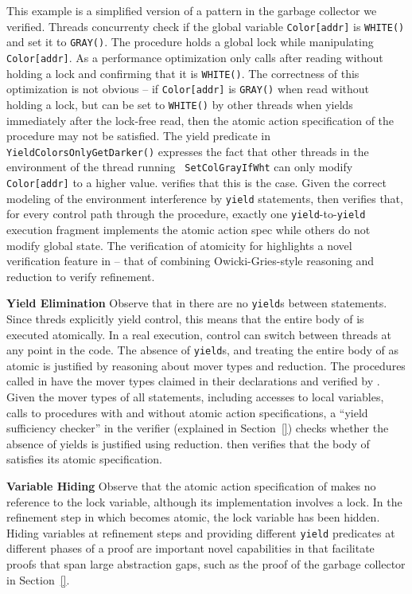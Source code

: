 This example is a simplified version of a pattern in the garbage
collector we verified. Threads concurrenty check 
if the global variable {\tt Color[addr]} is {\tt WHITE()}
and set it to {\tt GRAY()}. The procedure   holds a global lock while
manipulating {\tt Color[addr]}. 
As a performance optimization  only calls 
 after reading  without holding a lock
and confirming that it is {\tt WHITE()}. The correctness of this
optimization is not obvious -- if {\tt Color[addr]} is {\tt GRAY()} when
read without holding a lock, but can be set to {\tt WHITE()} by other 
threads when  yields immediately after the
lock-free read, then the atomic action
specification of the procedure may not be satisfied. The yield
predicate in {\tt YieldColorsOnlyGetDarker()} expresses the fact that
other threads in the environment of the thread running {\tt
  SetColGrayIfWht} can only modify {\tt Color[addr]} to a higher
value. \civl verifies that this is the case. Given the correct
modeling of the environment interference by {\tt yield} statements,
\civl then verifies that, for every control path through the
procedure, exactly one {\tt yield}-to-{\tt yield} execution
fragment implements the atomic action spec while others do not modify
global state. The verification of atomicity for  highlights a
novel verification feature in \civl -- that of combining
Owicki-Gries-style reasoning and reduction to verify refinement.

{\bf Yield Elimination} Observe that in 
 there are no {\tt yield}s between
statements. Since threds explicitly yield control, this means that the
entire body of  is executed atomically. In
a real execution, control can switch between threads at any point in
the code. The absence of {\tt yield}s, and treating the entire body of
 as atomic is justified by reasoning about
mover types and reduction. The procedures called in
 have the mover types claimed in their
declarations and verified by \civl. Given the mover types of all
statements, including accesses to local variables, calls to procedures
with and without atomic action specifications, a ``yield sufficiency
checker'' in the \civl verifier (explained in Section~\ref{}) checks
whether the absence of yields is justified using reduction.  \civl
then verifies that the body of  satisfies
its atomic specification.

{\bf Variable Hiding} Observe that the atomic action specification of
 makes no reference to the lock variable,
although its implementation involves a lock. In the refinement step in
which  becomes atomic, the lock variable has
been hidden. Hiding variables at refinement steps and providing
different {\tt yield} predicates at different phases of a proof are
important novel capabilities in \civl that facilitate proofs that span
large abstraction gaps, such as the proof of the garbage collector in
Section~\ref{}. 

